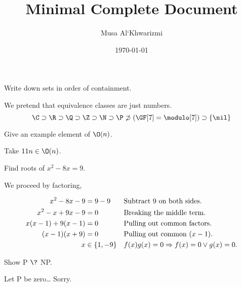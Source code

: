 \documentclass{homework}
\author{Musa Al`Khwarizmi}
\date{\today}
\title{Minimal Complete Document}
\begin{document}
\maketitle

\question Write down sets in order of containment.
\label{sec:org3bcb8f3}

We pretend that equivalence classes are just numbers.
\[
  \C \supset \R \supset \Q \supset \Z \supset \N \supset \P \not\supset (\GF[7] = \modulo[7]) \supset \{\nil\}
\]

\question Give an example element of \(\O(n)\).
\label{sec:org61c5625}

Take \(11n \in \O(n)\).

\question Find roots of \(x^2- 8x = 9\).
\label{sec:orgd5cb924}

We proceed by factoring,

\begin{align*}
  x^2- 8x - 9         & = 9-9         &  & \text{Subtract 9 on both sides.}         \\
  x^2- x + 9x - 9     & = 0           &  & \text{Breaking the middle term.}         \\
  x(x - 1) + 9(x - 1) & = 0           &  & \text{Pulling out common factors.}       \\
  (x - 1)(x + 9)      & = 0           &  & \text{Pulling out common } (x - 1).      \\
  x                   & \in \{1, -9\} &  & f(x)g(x) = 0 \Rightarrow f(x) = 0 \vee g(x) = 0. \\
\end{align*}

\question Show P \(\?\) NP.
\label{sec:org280f50e}

Let P be zero\ldots{} Sorry.
\end{document}
